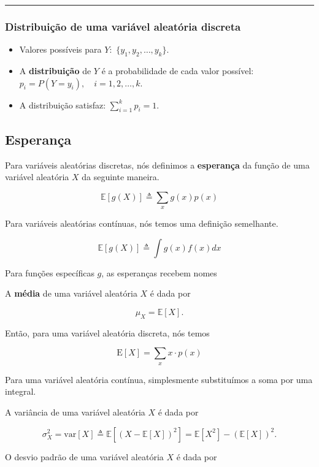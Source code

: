 \documentclass[]{article}
\providecommand{\tightlist}{%
  \setlength{\itemsep}{0pt}\setlength{\parskip}{0pt}}
\begin{document}
\begin{center}\rule{0.5\linewidth}{\linethickness}\end{center}

\subsubsection{Distribuição de uma variável aleatória
discreta}\label{distribuicao-de-uma-variavel-aleatoria-discreta}

\begin{itemize}
\tightlist
\item
  Valores possíveis para \(Y\):~\(\{y_1,y_2,\ldots,y_k\}\).
\item
  A \textbf{distribuição} de \(Y\) é a probabilidade de cada valor
  possível:~\(p_i=P(Y=y_i), \quad i=1,2,\ldots,k\).
\item
  A distribuição satisfaz: \(\sum_{i=1}^kp_i=1\).
\end{itemize}

\subsection{Esperança}\label{esperanca}

Para variáveis aleatórias discretas, nós definimos a \textbf{esperança}
da função de uma variável aleatória \(X\) da seguinte maneira.

\[ \mathbb{E}[g(X)] \triangleq \sum_{x} g(x)p(x) \]

Para variáveis aleatórias contínuas, nós temos uma definição semelhante.

\[ \mathbb{E}[g(X)] \triangleq \int g(x)f(x) dx \]

Para funções específicas \(g\), as esperanças recebem nomes

A \textbf{média} de uma variável aleatória \(X\) é dada por

\[ \mu_{X} = \mathbb{E}[X]. \]

Então, para uma variável aleatória discreta, nós temos

\[ \text{E}[X] = \sum_{x} x \cdot p(x) \]

Para uma variável aleatória contínua, simplesmente substituímos a soma
por uma integral.

A variância de uma variável aleatória \(X\) é dada por

\[ \sigma^2_{X} = \text{var}[X] \triangleq \mathbb{E}[(X - \mathbb{E}[X])^2] = \mathbb{E}[X^2] - (\mathbb{E}[X])^2. \]

O desvio padrão de uma variável aleatória \(X\) é dada por
\end{document}
